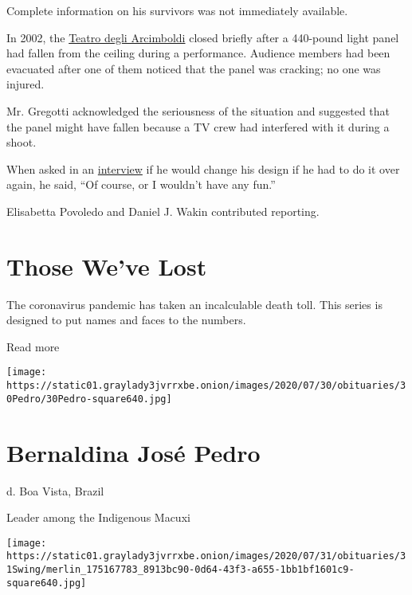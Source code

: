 Complete information on his survivors was not immediately available.

In 2002, the \href{http://teatroarcimboldi.it/index.php}{Teatro degli
Arcimboldi} closed briefly after a 440-pound light panel had fallen from
the ceiling during a performance. Audience members had been evacuated
after one of them noticed that the panel was cracking; no one was
injured.

Mr. Gregotti acknowledged the seriousness of the situation and suggested
that the panel might have fallen because a TV crew had interfered with
it during a shoot.

When asked in an
\href{https://www.nytimes3xbfgragh.onion/2002/03/05/arts/arts-abroad-a-proud-renovation-aside-from-that-falling-glass.html}{interview}
if he would change his design if he had to do it over again, he said,
``Of course, or I wouldn't have any fun.''

Elisabetta Povoledo and Daniel J. Wakin contributed reporting.

\href{https://www.nytimes3xbfgragh.onion/interactive/2020/obituaries/people-died-coronavirus-obituaries.html?action=click\&pgtype=Article\&state=default\&region=BELOW_MAIN_CONTENT\&context=covid_obits_promo}{}

\hypertarget{those-weve-lost}{%
\section{Those We've Lost}\label{those-weve-lost}}

The coronavirus pandemic has taken an incalculable death toll. This
series is designed to put names and faces to the numbers.

Read more

\texttt{[image: https://static01.graylady3jvrrxbe.onion/images/2020/07/30/obituaries/30Pedro/30Pedro-square640.jpg]}

\hypertarget{bernaldina-josuxe9-pedro}{%
\section{Bernaldina José Pedro}\label{bernaldina-josuxe9-pedro}}

d. Boa Vista, Brazil

Leader among the Indigenous Macuxi

\texttt{[image: https://static01.graylady3jvrrxbe.onion/images/2020/07/31/obituaries/31Swing/merlin\_175167783\_8913bc90-0d64-43f3-a655-1bb1bf1601c9-square640.jpg]}

